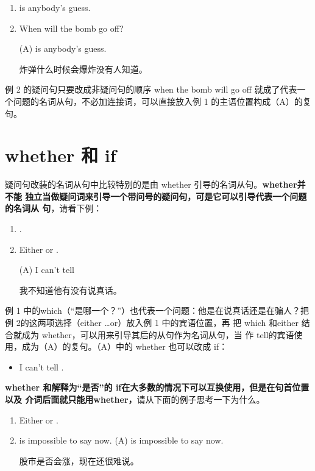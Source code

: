 \begin{enumerate}
\item {} is anybody's guess.
\item When will the bomb go off?

\reitem (A)  is anybody's guess.

炸弹什么时候会爆炸没有人知道。
\end{enumerate}

例 2 的疑问句只要改成非疑问句的顺序 when the bomb will go off
就成了代表一个问题的名词从句，不必加连接词，可以直接放入例 1
的主语位置构成（A）的复句。

\section{whether 和 if}

疑问句改装的名词从句中比较特别的是由 whether 引导的名词从句。\textbf{whether并不能
  独立当做疑问词来引导一个带问号的疑问句，可是它可以引导代表一个问题的名词从
  句}，请看下例：

\begin{enumerate}
\item {}  .
\item Either  or .

  \reitem (A) I can't tell 

  我不知道他有没有说真话。
\end{enumerate}

例 1 中的which（“是哪一个？”）也代表一个问题：他是在说真话还是在骗人？把
例 2的这两项选择（either \ldots or）放入例 1 中的宾语位置，再
把 which 和either 结合就成为 whether，可以用来引导其后的从句作为名词从句，当
作 tell的宾语使用，成为（A）的复句。（A）中的 whether 也可以改成 if：

\begin{itemize}
\item I can't tell .
\end{itemize}

\textbf{whether 和解释为“是否”的 if在大多数的情况下可以互换使用，但是在句首位置以及
介词后面就只能用whether，}请从下面的例子思考一下为什么。

\begin{enumerate}
\item Either  or .
\item {} is impossible to say now.
\reitem (A)  is impossible to say now.

股市是否会涨，现在还很难说。
\end{enumerate}


